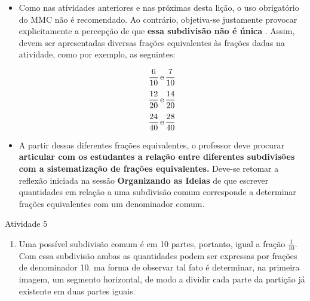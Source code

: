 \begin{multicols}{2}
  \begin{itemize} %
    \item       Como nas atividades anteriores e nas próximas desta lição, o uso obrigatório do MMC não é recomendado. Ao contrário, objetiva-se justamente provocar explicitamente a percepção de que       {\bf essa subdivisão não é única}      . Assim, devem ser apresentadas diversas frações equivalentes às frações dadas na atividade, como por exemplo, as seguintes:
  
  $$\frac{6}{10} \,{\rm e} \, \frac{7}{10}$$  
  $$\frac{12}{20} \,{\rm e} \, \frac{14}{20}$$  
  $$\frac{24}{40} \,{\rm e} \, \frac{28}{40}$$  
  
    \item       A partir dessas diferentes frações equivalentes, o professor deve procurar       {\bf articular com os estudantes a relação entre diferentes subdivisões com a sistematização de frações equivalentes.}       Deve-se retomar a reflexão iniciada na sessão       {\bf Organizando as Ideias}       de que escrever quantidades em relação a uma subdivisão comum corresponde a determinar frações equivalentes com um denominador comum.
\end{itemize} %

\begin{resposta*}{Atividade 5}  
\begin{enumerate} [\quad a)] %
    \item       Uma possível subdivisão comum é em 10 partes, portanto, igual a fração       $\frac{1}{10}$. Com essa subdivisão ambas as quantidades podem ser expressas por frações de denominador 10. ma forma de observar tal fato é determinar, na primeira imagem, um segmento horizontal, de modo a dividir cada parte da partição já existente em duas partes iguais.  

    \begin{center}    
\end{center}


\end{enumerate}
\end{resposta*}
\end{multicols}
